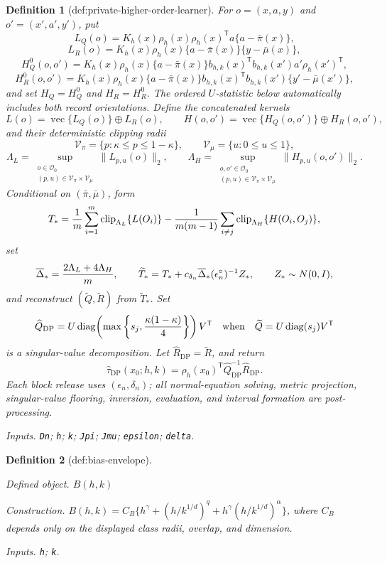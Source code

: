 \documentclass{article}
\newtheorem{definition}{Definition}
\begin{document}
\begin{definition}[def:private-higher-order-learner]
For \(o=(x,a,y)\) and \(o'=(x',a',y')\), put
\[
 L_Q(o)=K_h(x)\rho_h(x)\rho_h(x)^{\mathsf T}a\{a-\bar\pi(x)\},
\]
\[
 L_R(o)=K_h(x)\rho_h(x)\{a-\bar\pi(x)\}\{y-\bar\mu(x)\},
\]
\[
 H_Q^0(o,o')=K_h(x)\rho_h(x)\{a-\bar\pi(x)\}
 b_{h,k}(x)^{\mathsf T}b_{h,k}(x')a'\rho_h(x')^{\mathsf T},
\]
\[
 H_R^0(o,o')=K_h(x)\rho_h(x)\{a-\bar\pi(x)\}
 b_{h,k}(x)^{\mathsf T}b_{h,k}(x')\{y'-\bar\mu(x')\},
\]
and set \(H_Q=H_Q^0\) and \(H_R=H_R^0\).  The ordered \(U\)-statistic below automatically includes both record orientations.  Define the concatenated kernels
\[
 L(o)=\operatorname{vec}\{L_Q(o)\}\mathbin\oplus L_R(o),
 \qquad
 H(o,o')=\operatorname{vec}\{H_Q(o,o')\}\mathbin\oplus H_R(o,o'),
\]
and their deterministic clipping radii
\[
 \mathcal V_\pi=\{p:\kappa\le p\le1-\kappa\},
 \qquad \mathcal V_\mu=\{u:0\le u\le1\},
\]
\[
 \Lambda_L=\sup_{\substack{o\in\mathcal O_0\\(p,u)\in\mathcal V_\pi\times\mathcal V_\mu}}
       \lVert L_{p,u}(o)\rVert_2,
 \qquad
 \Lambda_H=\sup_{\substack{o,o'\in\mathcal O_0\\(p,u)\in\mathcal V_\pi\times\mathcal V_\mu}}
       \lVert H_{p,u}(o,o')\rVert_2.
\]
Conditional on \((\bar\pi,\bar\mu)\), form
\[
 T_*={1\over m}\sum_{i=1}^m\operatorname{clip}_{\Lambda_L}\{L(O_i)\}
 -{1\over m(m-1)}\sum_{i\ne j}\operatorname{clip}_{\Lambda_H}\{H(O_i,O_j)\},
\]
set
\[
 \overline\Delta_*={2\Lambda_L+4\Lambda_H\over m},
 \qquad
 \widetilde T_*=T_*+c_{\delta_n}\overline\Delta_*(\epsilon_n^\circ)^{-1}Z_*,
 \qquad Z_*\sim N(0,I),
\]
and reconstruct \((\widetilde Q,\widetilde R)\) from \(\widetilde T_*\).  Set
\[
 \widehat Q_{\mathrm{DP}}
 =U\operatorname{diag}\!\left(\max\left\{s_j,
 {\kappa(1-\kappa)\over4}\right\}\right)V^{\mathsf T}
 \quad\text{when}\quad
 \widetilde Q=U\operatorname{diag}(s_j)V^{\mathsf T}
\]
is a singular-value decomposition.  Let \(\widehat R_{\mathrm{DP}}=\widetilde R\), and return
\[
 \widehat\tau_{\mathrm{DP}}(x_0;h,k)
 =\rho_h(x_0)^{\mathsf T}\widehat Q_{\mathrm{DP}}^{-1}\widehat R_{\mathrm{DP}}.
\]
Each block release uses \((\epsilon_n,\delta_n)\); all normal-equation solving, metric projection, singular-value flooring, inversion, evaluation, and interval formation are post-processing.
\par\smallskip\noindent\emph{Inputs.} \texttt{Dn}; \texttt{h}; \texttt{k}; \texttt{Jpi}; \texttt{Jmu}; \texttt{epsilon}; \texttt{delta}.
\end{definition}

\begin{definition}[def:bias-envelope]\label{def:bias-envelope}
\par\smallskip\noindent\emph{Defined object.} \(B(h,k)\)
\par\smallskip\noindent\emph{Construction.} \(B(h,k)=C_B\{h^\gamma+(h/k^{1/d})^q+h^\gamma(h/k^{1/d})^\alpha\}\), where \(C_B\) depends only on the displayed class radii, overlap, and dimension.
\par\smallskip\noindent\emph{Inputs.} \texttt{h}; \texttt{k}.
\end{definition}
\end{document}
